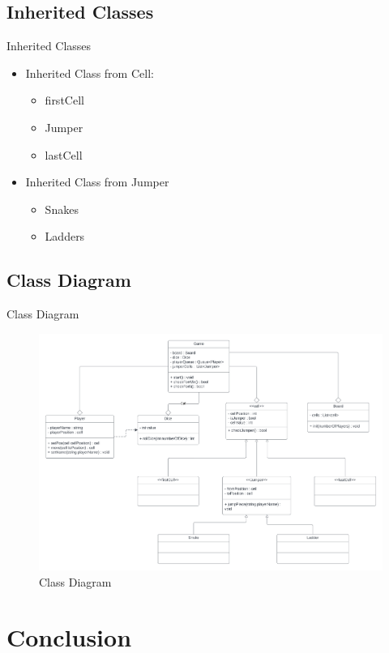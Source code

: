 \documentclass{beamer}
\begin{document}
\subsection{Inherited Classes}
\begin{frame}{Inherited Classes}
    \begin{itemize}
        \item Inherited Class from Cell:
        \begin{itemize}
            \item firstCell
            \item Jumper
            \item lastCell
        \end{itemize}
        \item Inherited Class from Jumper
        \begin{itemize}
            \item Snakes
            \item Ladders
        \end{itemize}
    \end{itemize}
\end{frame}
\subsection{Class Diagram}
\begin{frame}{Class Diagram}
    \begin{figure}
        \centering
        \includegraphics[width = 0.9\linewidth]{images/Class Diagram.png}
        \caption{Class Diagram}
        \label{fig:enter-label}
    \end{figure}
\end{frame}
\section{Conclusion}
\end{document}
